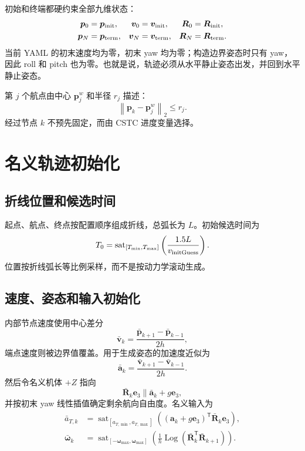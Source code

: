 \documentclass[UTF8,a4paper,11pt]{ctexart}
\newcommand{\Log}{\operatorname{Log}}
\newcommand{\sat}{\operatorname{sat}}
\newcommand{\normtwo}[1]{\left\lVert#1\right\rVert_2}
\begin{document}
初始和终端都硬约束全部九维状态：
\begin{align}
 \bm p_0&=\bm p_{\rm init},&
 \bm v_0&=\bm v_{\rm init},&
 \bm R_0&=\bm R_{\rm init},\\
 \bm p_N&=\bm p_{\rm term},&
 \bm v_N&=\bm v_{\rm term},&
 \bm R_N&=\bm R_{\rm term}.
\end{align}
当前 YAML 的初末速度均为零，初末 yaw 均为零；构造边界姿态时只有 yaw，
因此 roll 和 pitch 也为零。也就是说，轨迹必须从水平静止姿态出发，并回到水平
静止姿态。

第 $j$ 个航点由中心 $\bm p_j^w$ 和半径 $r_j$ 描述：
\begin{equation}
 \normtwo{\bm p_k-\bm p_j^w}\leq r_j.
 \label{eq:waypoint-ball}
\end{equation}
经过节点 $k$ 不预先固定，而由 CSTC 进度变量选择。

\section{名义轨迹初始化}

\subsection{折线位置和候选时间}

起点、航点、终点按配置顺序组成折线，总弧长为 $L$。初始候选时间为
\begin{equation}
 T_0=\sat_{[T_{\min},T_{\max}]}
 \left(\frac{1.5L}{v_{\rm initGuess}}\right).
 \label{eq:initial-time}
\end{equation}
位置按折线弧长等比例采样，而不是按动力学滚动生成。

\subsection{速度、姿态和输入初始化}

内部节点速度使用中心差分
\begin{equation}
 \bar{\bm v}_k=\frac{\bar{\bm p}_{k+1}-\bar{\bm p}_{k-1}}{2h},
\end{equation}
端点速度则被边界值覆盖。用于生成姿态的加速度近似为
\begin{equation}
 \bar{\bm a}_k=\frac{\bar{\bm v}_{k+1}-\bar{\bm v}_{k-1}}{2h}.
\end{equation}
然后令名义机体 $+Z$ 指向
\begin{equation}
 \bar{\bm R}_k\bm e_3\parallel \bar{\bm a}_k+g\bm e_3,
\end{equation}
并按初末 yaw 线性插值确定剩余航向自由度。名义输入为
\begin{align}
 \bar a_{T,k}&=\sat_{[a_{T,\min},a_{T,\max}]}
 \left((\bm a_k+g\bm e_3)^\mathsf T\bar{\bm R}_k\bm e_3\right),\\
 \bar{\bm\omega}_k&=\sat_{[-\bm\omega_{\max},\bm\omega_{\max}]}
 \left(\frac1h\Log(\bar{\bm R}_k^\mathsf T\bar{\bm R}_{k+1})\right).
\end{align}
\end{document}
